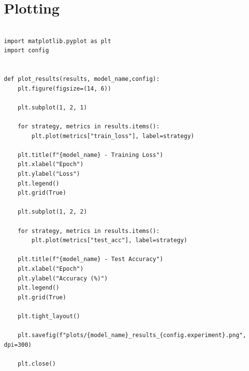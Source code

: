 \chapter{Plotting}
\label{appendix:plotting}

\begin{verbatim}

import matplotlib.pyplot as plt
import config


def plot_results(results, model_name,config):
    plt.figure(figsize=(14, 6))

    plt.subplot(1, 2, 1)

    for strategy, metrics in results.items():
        plt.plot(metrics["train_loss"], label=strategy)

    plt.title(f"{model_name} - Training Loss")
    plt.xlabel("Epoch")
    plt.ylabel("Loss")
    plt.legend()
    plt.grid(True)

    plt.subplot(1, 2, 2)

    for strategy, metrics in results.items():
        plt.plot(metrics["test_acc"], label=strategy)

    plt.title(f"{model_name} - Test Accuracy")
    plt.xlabel("Epoch")
    plt.ylabel("Accuracy (%)")
    plt.legend()
    plt.grid(True)

    plt.tight_layout()

    plt.savefig(f"plots/{model_name}_results_{config.experiment}.png", dpi=300)

    plt.close()

\end{verbatim}
